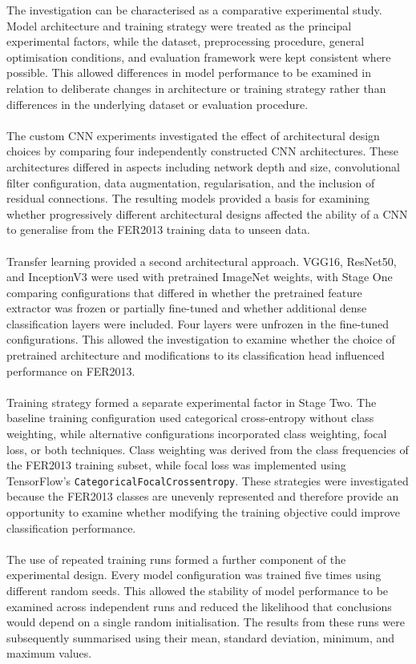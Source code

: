 \documentclass[12pt, a4paper]{report}
\begin{document}
				The investigation can be characterised as a comparative experimental study. Model architecture and training strategy were treated as the principal experimental factors, while the dataset, preprocessing procedure, general optimisation conditions, and evaluation framework were kept consistent where possible. This allowed differences in model performance to be examined in relation to deliberate changes in architecture or training strategy rather than differences in the underlying dataset or evaluation procedure.\\\\
				The custom CNN experiments investigated the effect of architectural design choices by comparing four independently constructed CNN architectures. These architectures differed in aspects including network depth and size, convolutional filter configuration, data augmentation, regularisation, and the inclusion of residual connections. The resulting models provided a basis for examining whether progressively different architectural designs affected the ability of a CNN to generalise from the FER2013 training data to unseen data.\\\\
				Transfer learning provided a second architectural approach. VGG16, ResNet50, and InceptionV3 were used with pretrained ImageNet weights, with Stage One comparing configurations that differed in whether the pretrained feature extractor was frozen or partially fine-tuned and whether additional dense classification layers were included. Four layers were unfrozen in the fine-tuned configurations. This allowed the investigation to examine whether the choice of pretrained architecture and modifications to its classification head influenced performance on FER2013.\\\\
				Training strategy formed a separate experimental factor in Stage Two. The baseline training configuration used categorical cross-entropy without class weighting, while alternative configurations incorporated class weighting, focal loss, or both techniques. Class weighting was derived from the class frequencies of the FER2013 training subset, while focal loss was implemented using TensorFlow's \texttt{CategoricalFocalCrossentropy}. These strategies were investigated because the FER2013 classes are unevenly represented and therefore provide an opportunity to examine whether modifying the training objective could improve classification performance.\\\\
				The use of repeated training runs formed a further component of the experimental design. Every model configuration was trained five times using different random seeds. This allowed the stability of model performance to be examined across independent runs and reduced the likelihood that conclusions would depend on a single random initialisation. The results from these runs were subsequently summarised using their mean, standard deviation, minimum, and maximum values.
			\newpage
\end{document}
